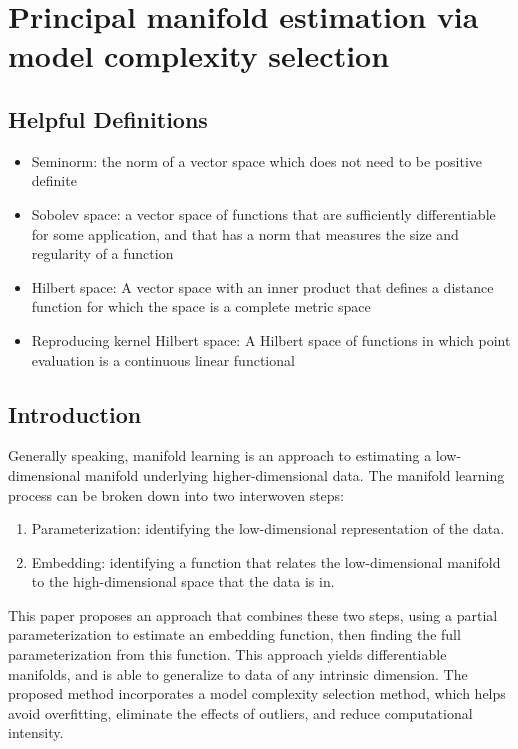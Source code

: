 \section*{Principal manifold estimation via model complexity selection}

\subsection*{Helpful Definitions}
\begin{itemize}
    \item Seminorm: the norm of a vector space which does not need to be positive definite
    \item Sobolev space: a vector space of functions that are sufficiently differentiable for some application, and that has a norm that measures the size and regularity of a function
    \item Hilbert space: A vector space with an inner product that defines a distance function for which the space is a complete metric space
    \item Reproducing kernel Hilbert space: A Hilbert space of functions in which point evaluation is a continuous linear functional
\end{itemize}

\subsection*{Introduction}
Generally speaking, manifold learning is an approach to estimating a low-dimensional manifold underlying higher-dimensional data. The manifold learning process can be broken down into two interwoven steps:
\begin{enumerate}
    \item Parameterization: identifying the low-dimensional representation of the data.
    \item Embedding: identifying a function that relates the low-dimensional manifold to the high-dimensional space that the data is in.
\end{enumerate}

This paper proposes an approach that combines these two steps, using a partial parameterization to estimate an embedding function, then finding the full parameterization from this function. This approach yields differentiable manifolds, and is able to generalize to data of any intrinsic dimension. The proposed method incorporates a model complexity selection method, which helps avoid overfitting, eliminate the effects of outliers, and reduce computational intensity.

